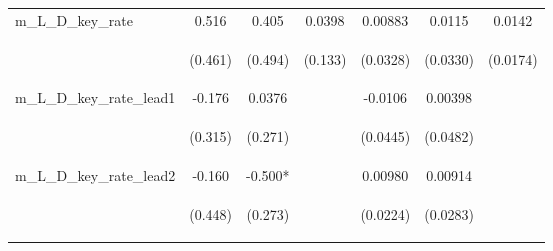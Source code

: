 \documentclass[]{article}
\begin{document}
\begin{center}
\begin{tabular}{lcccccc}
m\_L\_D\_key\_rate & 0.516 & 0.405 & 0.0398 & 0.00883 & 0.0115 & 0.0142 \\
\vspace{4pt} & \begin{footnotesize}(0.461)\end{footnotesize} & \begin{footnotesize}(0.494)\end{footnotesize} & \begin{footnotesize}(0.133)\end{footnotesize} & \begin{footnotesize}(0.0328)\end{footnotesize} & \begin{footnotesize}(0.0330)\end{footnotesize} & \begin{footnotesize}(0.0174)\end{footnotesize} \\
m\_L\_D\_key\_rate\_lead1 & -0.176 & 0.0376 &  & -0.0106 & 0.00398 &  \\
\vspace{4pt} & \begin{footnotesize}(0.315)\end{footnotesize} & \begin{footnotesize}(0.271)\end{footnotesize} & \begin{footnotesize}\end{footnotesize} & \begin{footnotesize}(0.0445)\end{footnotesize} & \begin{footnotesize}(0.0482)\end{footnotesize} & \begin{footnotesize}\end{footnotesize} \\
m\_L\_D\_key\_rate\_lead2 & -0.160 & -0.500* &  & 0.00980 & 0.00914 &  \\
\vspace{4pt} & \begin{footnotesize}(0.448)\end{footnotesize} & \begin{footnotesize}(0.273)\end{footnotesize} & \begin{footnotesize}\end{footnotesize} & \begin{footnotesize}(0.0224)\end{footnotesize} & \begin{footnotesize}(0.0283)\end{footnotesize} & \begin{footnotesize}\end{footnotesize} \\

\end{tabular}
\end{center}
\end{document}
